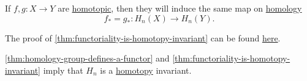 \begin{theorem}\label{thm:functoriality-is-homotopy-invariant}
	If \(f, g\colon X \to Y\) are \hyperref[def:homotopic]{homotopic}, then they will induce the same map on \hyperref[def:homology-group]{homology}
	\[
		f_\ast = g_\ast \colon H_n(X) \to H_n(Y).
	\]
\end{theorem}

The proof of \autoref{thm:functoriality-is-homotopy-invariant} can be found \hyperref[pf:functoriality-is-homotopy-invariant]{here}.

\begin{exercise}
	\autoref{thm:homology-group-defines-a-functor} and \autoref{thm:functoriality-is-homotopy-invariant} imply that \(H_{n} \) is a \hyperref[def:homotopy]{homotopy} invariant.
\end{exercise}
